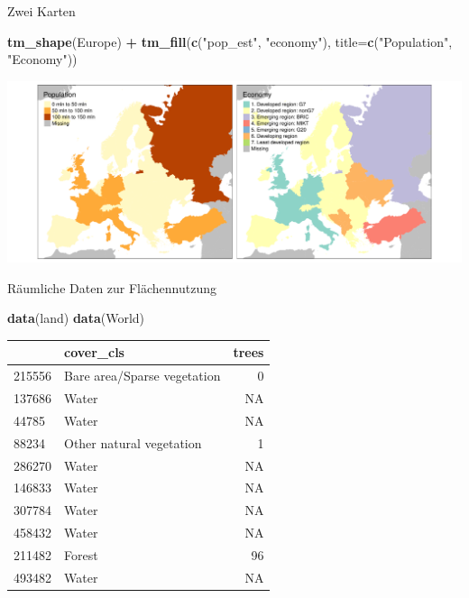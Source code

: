 \documentclass[ignorenonframetext,]{beamer}
\newenvironment{Shaded}{\begin{snugshade}}{\end{snugshade}}
\newcommand{\KeywordTok}[1]{\textcolor[rgb]{0.13,0.29,0.53}{\textbf{#1}}}
\newcommand{\DataTypeTok}[1]{\textcolor[rgb]{0.13,0.29,0.53}{#1}}
\newcommand{\StringTok}[1]{\textcolor[rgb]{0.31,0.60,0.02}{#1}}
\newcommand{\OperatorTok}[1]{\textcolor[rgb]{0.81,0.36,0.00}{\textbf{#1}}}
\newcommand{\NormalTok}[1]{#1}
\begin{document}
\begin{frame}[fragile]{Zwei Karten}

\begin{Shaded}
\begin{Highlighting}[]
\KeywordTok{tm_shape}\NormalTok{(Europe) }\OperatorTok{+}
\StringTok{    }\KeywordTok{tm_fill}\NormalTok{(}\KeywordTok{c}\NormalTok{(}\StringTok{"pop_est"}\NormalTok{, }\StringTok{"economy"}\NormalTok{), }
        \DataTypeTok{title=}\KeywordTok{c}\NormalTok{(}\StringTok{"Population"}\NormalTok{, }\StringTok{"Economy"}\NormalTok{))}
\end{Highlighting}
\end{Shaded}

\includegraphics{tmap_files/figure-beamer/unnamed-chunk-40-1.pdf}

\end{frame}

\begin{frame}[fragile]{Räumliche Daten zur Flächennutzung}

\begin{Shaded}
\begin{Highlighting}[]
\KeywordTok{data}\NormalTok{(land)}
\KeywordTok{data}\NormalTok{(World)}
\end{Highlighting}
\end{Shaded}

\begin{longtable}[]{@{}llr@{}}
\toprule
& cover\_cls & trees\tabularnewline
\midrule
\endhead
215556 & Bare area/Sparse vegetation & 0\tabularnewline
137686 & Water & NA\tabularnewline
44785 & Water & NA\tabularnewline
88234 & Other natural vegetation & 1\tabularnewline
286270 & Water & NA\tabularnewline
146833 & Water & NA\tabularnewline
307784 & Water & NA\tabularnewline
458432 & Water & NA\tabularnewline
211482 & Forest & 96\tabularnewline
493482 & Water & NA\tabularnewline
\bottomrule
\end{longtable}

\end{frame}
\end{document}
